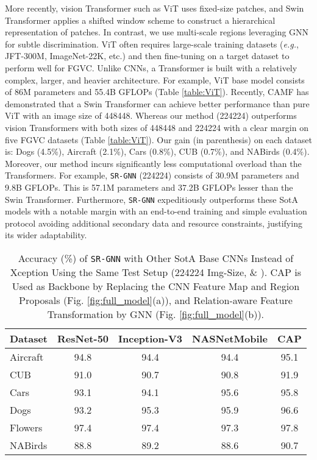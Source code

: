 \documentclass[journal]{IEEEtran}
\begin{document}
More recently, vision Transformer such as ViT \cite{dosovitskiy2020image} uses fixed-size patches, and Swin Transformer \cite{liu2021swin} applies a shifted window scheme to construct a hierarchical representation of patches. In contrast, we use multi-scale regions leveraging  GNN for subtle discrimination. ViT often requires large-scale training datasets (\textit{e.g.}, JFT-300M, ImageNet-22K, etc.) and then fine-tuning on a target dataset to perform well for FGVC. Unlike CNNs, a Transformer is built with a relatively complex, larger, and heavier architecture. For example, ViT base model consists of 86M parameters and 55.4B GFLOPs (Table \ref{table:ViT}). Recently, CAMF \cite{miao2021complemental} has demonstrated that a Swin Transformer can achieve better performance than pure ViT with an image size of 448448. Whereas our method (224224) outperforms vision Transformers with both sizes of 448448 and 224224 with a clear margin on five FGVC datasets (Table \ref{table:ViT}). Our gain (in parenthesis) on each dataset is: Dogs (4.5\%), Aircraft (2.1\%), Cars (0.8\%), CUB (0.7\%), and NABirds (0.4\%). Moreover, our method incurs significantly less computational overload than the Transformers. For example, \texttt{SR-GNN} (224224) consists of 30.9M parameters and 9.8B GFLOPs. This is 57.1M parameters and 37.2B GFLOPs lesser than the Swin Transformer. Furthermore, \texttt{SR-GNN} expeditiously outperforms these SotA models with a notable margin with an end-to-end training and simple evaluation protocol avoiding additional secondary data and resource constraints, justifying its wider adaptability. 
\begin{table} [t]
\begin{center}
 \caption{Accuracy (\%) of \texttt{SR-GNN} with Other SotA Base CNNs Instead of Xception Using the Same Test Setup (224224 Img-Size,  \& ). CAP is Used as Backbone by Replacing the CNN Feature Map and Region Proposals (Fig. \ref{fig:full_model}(a)), and  Relation-aware Feature Transformation by GNN (Fig. \ref{fig:full_model}(b)).}
 \label{table:baseCNN}
\begin{tabular}{|l| c c c |c|}
 \hline
Dataset & ResNet-50 & Inception-V3 & NASNetMobile & CAP\\
\hline
  Aircraft &94.8 & 94.4 & 94.4 & 95.1 \\
  CUB &91.0 & 90.7 & 90.8 & 91.9 \\
  Cars & 93.1 & 94.1 & 95.6 & 95.8\\
  Dogs & 93.2 & 95.3 &95.9 & 96.6\\ 
  Flowers &97.4 & 97.4 & 97.3 & 97.8\\
  NABirds &88.8 & 89.2 & 88.6 & 90.7\\
\hline
\end{tabular}
 \end{center}
 \vspace{-0.4 cm}
\end{table}
\end{document}
